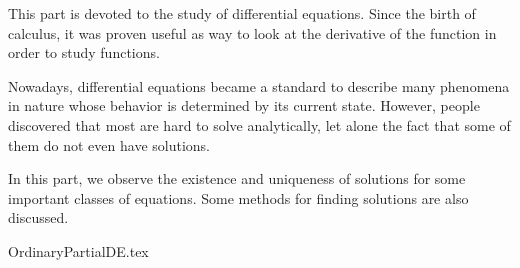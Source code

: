 \label{part:diffeq}

This part is devoted to the study of differential equations.
Since the birth of calculus,
it was proven useful as way to look at the derivative of the function
in order to study functions.

Nowadays, differential equations became a standard
to describe many phenomena in nature
whose behavior is determined by its current state.
However, people discovered that most are hard to solve analytically,
let alone the fact that some of them do not even have solutions.

In this part,
we observe the existence and uniqueness of solutions
for some important classes of equations.
Some methods for finding solutions are also discussed.

{OrdinaryPartialDE.tex}
